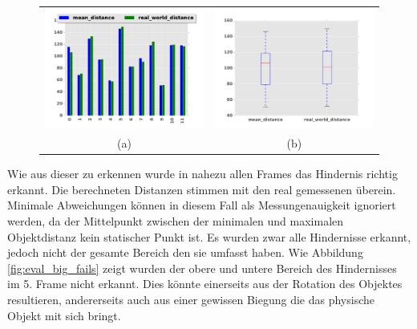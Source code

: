 \begin{figure}[h]
	\centering
	\begin{tabular}{cc}
	\includegraphics[width=7cm]{img/evaluation/diagrams/sub_big_bar}&
	\includegraphics[width=7cm]{img/evaluation/diagrams/sub_big_box}\\
	 (a) & (b)
	\end{tabular}
	\caption{}
    \label{fig:eval_big}
\end{figure}

\noindent
Wie aus dieser zu erkennen wurde in nahezu allen Frames das Hindernis richtig erkannt. Die berechneten Distanzen stimmen mit den real gemessenen überein. Minimale Abweichungen können in diesem Fall als Messungenauigkeit ignoriert werden, da der Mittelpunkt zwischen der minimalen und maximalen Objektdistanz kein statischer Punkt ist. Es wurden zwar alle Hindernisse erkannt, jedoch nicht der gesamte Bereich den sie umfasst haben. Wie Abbildung \ref{fig:eval_big_fails} zeigt wurden der obere und untere Bereich des Hindernisses im 5. Frame nicht erkannt. Dies könnte einerseits aus der Rotation des Objektes resultieren, andererseits auch aus einer gewissen Biegung die das physische Objekt mit sich bringt.

